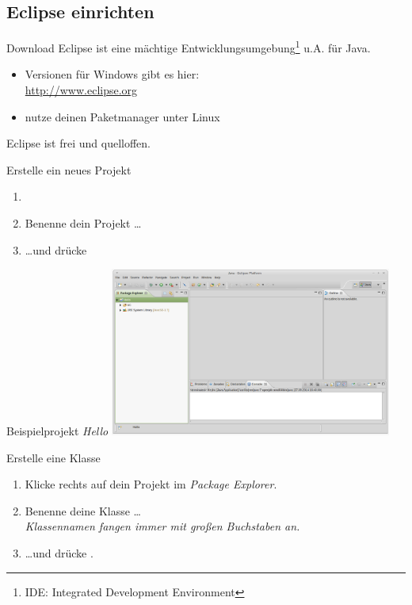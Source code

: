 \subsection{Eclipse einrichten}
\begin{frame}{Download}
	Eclipse ist eine mächtige Entwicklungsumgebung\footnote{IDE: Integrated Development Environment} u.A. für Java.
	\begin{itemize}
		\item Versionen für Windows gibt es hier:\\
			\url{http://www.eclipse.org}
		\item nutze deinen Paketmanager unter Linux
	\end{itemize}
	Eclipse ist frei und quelloffen.
\end{frame}

\begin{frame}{Erstelle ein neues Projekt}
	\begin{enumerate}
		\item {}
		\item Benenne dein Projekt \dots
		\item \dots und drücke 
	\end{enumerate}
\end{frame}

\begin{frame}{Beispielprojekt \emph{Hello}}
	\includegraphics[width=25em]{res/intro_eclipse.png}
\end{frame}

\begin{frame}{Erstelle eine Klasse}
	\begin{enumerate}
		\item Klicke rechts auf dein Projekt im \emph{Package Explorer}. \hfill \\
		\item Benenne deine Klasse \dots \\
			\emph{Klassennamen fangen immer mit großen Buchstaben an.}
		\item \dots und drücke .
	\end{enumerate}
\end{frame}

